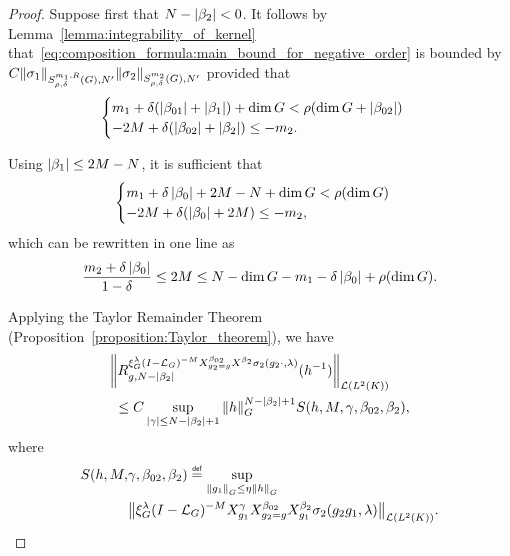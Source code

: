 \begin{proof}
    Suppose first that $N - \abs {\beta_2} < 0$.
    It follows by Lemma~\ref{lemma:integrability_of_kernel}
    that~\eqref{eq:composition_formula:main_bound_for_negative_order} is bounded by $C \SymbolSemiNorm {m_1, R} {\rho, \delta} {N'} {\sigma_1} \SymbolSemiNorm {m_2} {\rho, \delta} {N'} {\sigma_2}$
    provided that
    \begin{align*}
        \begin{cases}
            m_1 + \delta (\abs {\beta_{01}} + \abs {\beta_1}) + \dim \Group < \rho(\dim \Group + \abs {\beta_{02}})\\
            -2 M + \delta(\abs {\beta_{02}} + \abs {\beta_2}) \leq - m_2.
        \end{cases}
    \end{align*}

    Using $\abs {\beta_1} \leq 2M - N$,
    it is sufficient that
    \begin{align*}
        \begin{cases}
            m_1 + \delta \abs {\beta_{0}} + 2 M - N + \dim \Group < \rho(\dim \Group)\\
            -2 M + \delta(\abs {\beta_{0}} + 2 M) \leq - m_2,
        \end{cases}
    \end{align*}
    which can be rewritten in one line as
    \begin{align}
        \frac {m_2 + \delta \abs {\beta_{0}}} {1 - \delta} \leq 2 M
        \leq N - \dim \Group - m_1 - \delta \abs {\beta_0} + \rho (\dim \Group).
        \label{eq:composition_formula:first_condition_on_M}
    \end{align}

    Applying the Taylor Remainder Theorem (Proposition~\ref{proposition:Taylor_theorem}),
    we have
    \begin{align*}
        &\norm [\Lin {\Lebesgue 2 \CompactGroup}] {\TaylorRemainder {\Rep \lambda \BesselPotentialSquared {-M} \LeftDifferentialOperator [g_2 = g] {\beta_{02}} \LeftDifferentialOperator {\beta_2} \sigma_2(g_2 \dummy, \lambda)} g {N - \abs {\beta_2}} (h^{-1})}\\
        &\ \leq C
        \sup_{\abs \gamma \leq N - \abs {\beta_2} + 1}
        \norm [\Group] h^{N - \abs {\beta_2} + 1}
        S(h, M, \gamma, \beta_{02}, \beta_2),
    \end{align*}
    where
    \begin{align*}
        S(h, M, &\gamma, \beta_{02}, \beta_2 ) \defeq
        \sup_{\norm [\Group] {g_1} \leq \eta \norm [\Group] h}\\
        &\norm [\Lin {\Lebesgue 2 \CompactGroup}] {%
            \Rep \lambda \BesselPotentialSquared {-M}
            \LeftDifferentialOperator [g_1] {\gamma}
            \LeftDifferentialOperator [g_2 = g] {\beta_{02}}
            \LeftDifferentialOperator [g_1] {\beta_2}
            \sigma_2(g_2 g_1, \lambda)
        }.
    \end{align*}


\end{proof}
